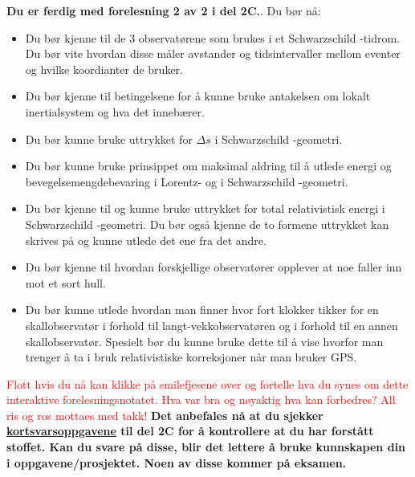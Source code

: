 \documentclass{beamer}
\let\hrefori\href
\renewcommand{\href}[2]{{\setlength{\fboxsep}{1pt}\colorbox{sunset}{\hrefori{#1}{#2}}}}
\renewcommand{\ss}{Schwarz\-schild }
\newcommand{\pagebutton}[1]{\setbeamertemplate{button}{\tikz\node[inner xsep = 5pt, draw = structure!90, fill = green(ryb), rounded corners = 8pt]{\color{amber}\Large\insertbuttontext};}\beamerbutton{#1}}
\begin{document}
\begin{frame}
\label{oppsummering}
\hyperlink{gps20}{\pagebutton{\small Forrige side}}\href{https://nettskjema.no/a/171674}{ \Changey[1][yellow]{-2}}
\tiny
{\bf Du er ferdig med forelesning 2 av 2 i del 2C.}. Du bør nå:
\begin{itemize}
\item Du bør kjenne til de 3 observatørene som brukes i et \ss-tidrom. Du bør vite hvordan disse måler avstander og tidsintervaller mellom eventer og hvilke koordianter de bruker.
\item Du bør kjenne til betingelsene for å kunne bruke antakelsen om lokalt inertialsystem og hva det innebærer.
\item Du bør kunne bruke uttrykket for $\Delta s$ i \ss-geometri.
\item Du bør kunne bruke prinsippet om maksimal aldring til å utlede energi og bevegelsemengdebevaring i Lorentz- og i \ss-geometri.
\item Du bør kjenne til og kunne bruke uttrykket for total relativistisk energi i \ss-geometri. Du bør også kjenne de to formene uttrykket kan skrives på og kunne utlede det ene fra det andre.
\item Du bør kjenne til hvordan forskjellige observatører opplever at noe faller inn mot et sort hull.
\item Du bør kunne utlede hvordan man finner hvor fort klokker tikker for en skallobservatør i forhold til langt-vekkobservatøren og i forhold til en annen skallobservatør. Spesielt bør du kunne bruke dette til å vise hvorfor man trenger å ta i bruk relativistiske korreksjoner når man bruker GPS.
\end{itemize}
\textcolor{red}{Flott hvis du nå kan klikke på smilefjesene over og fortelle hva du synes om dette interaktive forelesningsnotatet. Hva var bra og nøyaktig hva kan forbedres? All ris og ros mottaes med takk!}
{\bf Det anbefales nå at du sjekker \href{https://www.uio.no/studier/emner/matnat/astro/AST2000/h21/undervisningsmateriell/kortsvarsoppgaver/del2c.pdf}{kortsvarsoppgavene} til del 2C for å kontrollere at du har forstått stoffet. Kan du svare på disse, blir det lettere å bruke kunnskapen din i oppgavene/prosjektet. Noen av disse kommer på eksamen.}
\end{frame}
\end{document}
